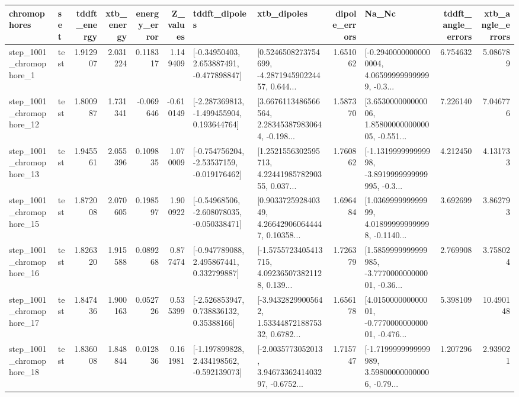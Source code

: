 \begin{tabular}{llrrrrllrlrr}
\toprule
             chromophores &       set &  tddft\_energy &  xtb\_energy &  energy\_error &  Z\_values &                               tddft\_dipoles &                                        xtb\_dipoles &  dipole\_errors &                                              Na\_Nc &  tddft\_angle\_errors &  xtb\_angle\_errors \\
\midrule
  step\_1001\_chromophore\_1 &      test &      1.912907 &    2.031224 &      0.118317 &  1.149409 &    [-0.34950403, 2.653887491, -0.477898847] &  [0.5246508273754699, -4.287194590224457, 0.644... &       1.651062 &  [-0.29400000000000004, 4.065999999999999, -0.3... &            6.754632 &          5.086789 \\
 step\_1001\_chromophore\_12 &      test &      1.800987 &    1.731341 &     -0.069646 & -0.610149 &   [-2.287369813, -1.499455904, 0.193644764] &  [3.6676113486566564, 2.283453879830644, -0.198... &       1.587370 &  [3.653000000000006, 1.8580000000000005, -0.551... &            7.226140 &          7.046776 \\
 step\_1001\_chromophore\_13 &      test &      1.945561 &    2.055396 &      0.109835 &  1.070009 &   [-0.754756204, -2.53537159, -0.019176462] &  [1.2521556302595713, 4.2244198578290355, 0.037... &       1.760862 &  [-1.131999999999998, -3.8919999999999995, -0.3... &            4.212450 &          4.131733 \\
 step\_1001\_chromophore\_15 &      test &      1.872008 &    2.070605 &      0.198597 &  1.900922 &   [-0.54968506, -2.608078035, -0.050338471] &  [0.903372592840349, 4.266429060644447, 0.10358... &       1.696484 &  [1.036999999999999, 4.018999999999998, -0.1140... &            3.692699 &          3.862793 \\
 step\_1001\_chromophore\_16 &      test &      1.826320 &    1.915588 &      0.089268 &  0.877474 &    [-0.947789088, 2.495867441, 0.332799887] &  [-1.5755723405413715, 4.092365073821128, 0.139... &       1.726379 &  [1.5859999999999985, -3.777000000000001, -0.36... &            2.769908 &          3.758024 \\
 step\_1001\_chromophore\_17 &      test &      1.847436 &    1.900163 &      0.052726 &  0.535399 &     [-2.526853947, 0.738836132, 0.35388166] &  [-3.94328299005642, 1.5334487218875332, 0.6782... &       1.656178 &  [4.015000000000001, -0.777000000000001, -0.476... &            5.398109 &         10.490148 \\
 step\_1001\_chromophore\_18 &      test &      1.836008 &    1.848844 &      0.012836 &  0.161981 &   [-1.197899828, 2.434198562, -0.592139073] &  [-2.0035773052013, 3.9467336241403297, -0.6752... &       1.715747 &  [-1.7199999999999989, 3.598000000000006, -0.79... &            1.207296 &          2.939021 \\

\end{tabular}
